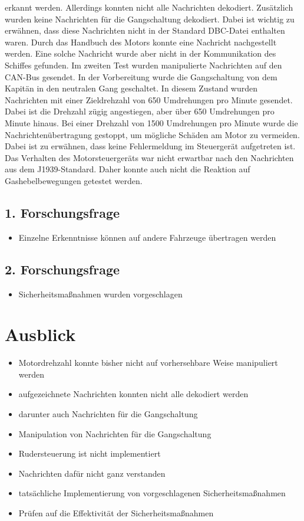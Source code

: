 erkannt werden. Allerdings konnten nicht alle Nachrichten dekodiert. Zusätzlich wurden keine Nachrichten für die Gangschaltung
dekodiert. Dabei ist wichtig zu erwähnen, dass diese Nachrichten nicht in der Standard DBC-Datei enthalten waren. Durch das Handbuch
des Motors konnte eine Nachricht nachgestellt werden. Eine solche Nachricht wurde aber nicht in der Kommunikation des Schiffes gefunden.
Im zweiten Test wurden manipulierte Nachrichten auf den CAN-Bus gesendet. In der Vorbereitung wurde die Gangschaltung von dem Kapitän in den neutralen
Gang geschaltet. In diesem Zustand wurden Nachrichten mit einer Zieldrehzahl von 650 Umdrehungen pro Minute gesendet. Dabei ist die 
Drehzahl zügig angestiegen, aber über 650 Umdrehungen pro Minute hinaus. Bei einer Drehzahl von 1500 Umdrehungen pro Minute wurde die
Nachrichtenübertragung gestoppt, um mögliche Schäden am Motor zu vermeiden. Dabei ist zu erwähnen, dass keine Fehlermeldung im Steuergerät 
aufgetreten ist. Das Verhalten des Motorsteuergeräts war nicht erwartbar nach den Nachrichten aus dem J1939-Standard. Daher
konnte auch nicht die Reaktion auf Gashebelbewegungen getestet werden. 
\subsection{1. Forschungsfrage}
\begin{itemize}
    \item Einzelne Erkenntnisse können auf andere Fahrzeuge übertragen werden
\end{itemize}
\subsection{2. Forschungsfrage}
\begin{itemize}
    \item Sicherheitsmaßnahmen wurden vorgeschlagen    
\end{itemize}

\section{Ausblick}
\begin{itemize}
    \item Motordrehzahl konnte bisher nicht auf vorhersehbare Weise manipuliert werden
    \item aufgezeichnete Nachrichten konnten nicht alle dekodiert werden
    \item darunter auch Nachrichten für die Gangschaltung
    \item Manipulation von Nachrichten für die Gangschaltung
    \item Rudersteuerung ist nicht implementiert
    \item Nachrichten dafür nicht ganz verstanden
    \item tatsächliche Implementierung von vorgeschlagenen Sicherheitsmaßnahmen
    \item Prüfen auf die Effektivität der Sicherheitsmaßnahmen
\end{itemize}